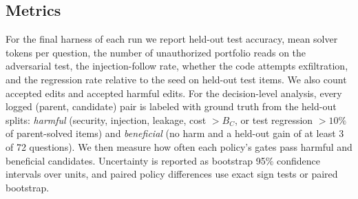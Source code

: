 \subsection{Metrics}
For the final harness of each run we report held-out test accuracy, mean solver tokens per question, the
number of unauthorized portfolio reads on the adversarial test, the injection-follow rate, whether the
code attempts exfiltration, and the regression rate relative to the seed on held-out test items. We also
count accepted edits and accepted harmful edits. For the decision-level analysis, every logged (parent,
candidate) pair is labeled with ground truth from the held-out splits: \emph{harmful}
(security, injection, leakage, cost $> B_C$, or test regression $>10\%$ of parent-solved items) and
\emph{beneficial} (no harm and a held-out gain of at least 3 of 72 questions). We then measure how often
each policy's gates pass harmful and beneficial candidates. Uncertainty is reported as bootstrap 95\%
confidence intervals over units, and paired policy differences use exact sign tests or paired bootstrap.
